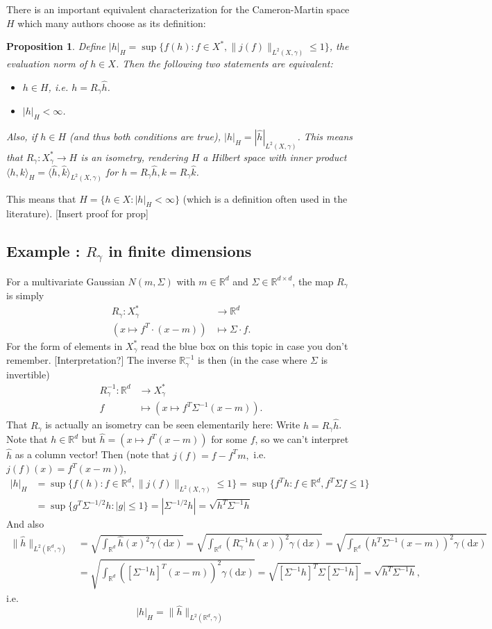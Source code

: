 \documentclass{scrartcl}
\newtheorem{prop}{Proposition}
\theoremstyle{definition}
\theoremstyle{remark}
\newcommand{\de}{\mathrm d}
\newcommand{\R}{\mathbb R}
\newcommand{\ednote}[1]{{\color{red}[#1]}}
\newcommand*\circled[1]{\tikz[baseline=(char.base)]{
            \node[shape=circle,draw,inner sep=2pt] (char) {#1};}}
\DeclareRobustCommand{\myboxtwo}[2][blue!20]{%
\begin{tcolorbox}[   %
        breakable,
        left=0pt,
        right=0pt,
        top=0pt,
        bottom=0pt,
        colback=#1,
        colframe=#1,
        width=\dimexpr\textwidth\relax, 
        enlarge left by=0mm,
        boxsep=5pt,
        arc=10pt,outer arc=10pt,
        ]
        #2
\end{tcolorbox}
}
\begin{document}
There is an important equivalent characterization for the Cameron-Martin space $H$ which many authors choose as its definition:
\begin{prop}
Define $|h|_H = \sup\{f(h): f\in X^*, \|j(f)\|_{L^2(X, \gamma)} \leq 1\}$, the evaluation norm of $h\in X$. Then the following two statements are equivalent:
\begin{itemize}
\item $h\in H$, i.e. $h = R_\gamma \hat h$.
\item $|h|_H < \infty$.
\end{itemize}
Also, if $h\in H$ (and thus both conditions are true), $|h|_H = |\hat h|_{L^2(X,\gamma)}$. This means that $R_\gamma: X_\gamma^* \to H$ is an isometry, rendering $H$ a Hilbert space  with inner product $\langle h, k\rangle_H = \langle \hat h, \hat k\rangle_{L^2(X,\gamma)}$ for $h = R_\gamma \hat h, k = R_\gamma \hat k$.
\end{prop}
This means that $H = \{h\in X: |h|_H < \infty\}$ (which is a definition often used in the literature).
\ednote{Insert proof for prop}
\myboxtwo[blue!20]{
\subsection*{Example \circled{1}: $R_\gamma$ in finite dimensions}
For a multivariate Gaussian $N(m, \Sigma)$ with $m\in\R^d$ and $\Sigma \in \R^{d\times d}$, the map $R_\gamma$ is simply 
\begin{align*}
R_\gamma : X_\gamma^* &\to \R^d\\
(x\mapsto f^T \cdot (x-m)) &\mapsto \Sigma \cdot f.
\end{align*}
For the form of elements in $X_\gamma^*$ read the blue box on this topic in case you don't remember. \ednote{Interpretation?} The inverse $\R_\gamma^{-1}$ is then (in the case where $\Sigma$ is invertible)
\begin{align*}
R_\gamma^{-1}: \R^d &\to X_\gamma^*\\
f &\mapsto (x\mapsto f^T \Sigma^{-1}(x-m)).
\end{align*}
That $R_\gamma$ is actually an isometry can be seen elementarily here: Write $h = R_\gamma \hat h$. Note that $h \in \R^d$ but $\hat h =(x\mapsto f^T(x-m))$ for some $f$, so we can't interpret $\hat h$ as a column vector! Then (note that $j(f) = f - f^Tm,$ i.e. $j(f)(x) = f^T(x-m)$),
\begin{align*}
|h|_H &= \sup\{f(h): f\in \R^d, \|j(f)\|_{L^2(X, \gamma)} \leq 1\} = \sup\{f^Th: f\in \R^d, f^T\Sigma f \leq 1\}\\
&= \sup\{g^T\Sigma^{-1/2}h: |g| \leq 1\} = |\Sigma^{-1/2}h| = \sqrt{h^T\Sigma^{-1}h}
\end{align*}
And also
\begin{align*}
\|\hat h\|_{L^2(\R^d, \gamma)} &= \sqrt{\int_{\R^d}\hat h(x)^2 \gamma(\de x)} = \sqrt{\int_{\R^d}(R_\gamma^{-1} h(x))^2 \gamma(\de x)} = \sqrt{\int_{\R^d}(h^T\Sigma^{-1}(x-m))^2 \gamma(\de x)}\\
&=\sqrt{\int_{\R^d}([\Sigma^{-1}h]^T(x-m))^2 \gamma(\de x)} = \sqrt{[\Sigma^{-1}h]^T\Sigma [\Sigma^{-1}h]} = \sqrt{h^T\Sigma^{-1}h},
\end{align*}
i.e. \[|h|_H = \|\hat h\|_{L^2(\R^d, \gamma)}\]
}
\end{document}
